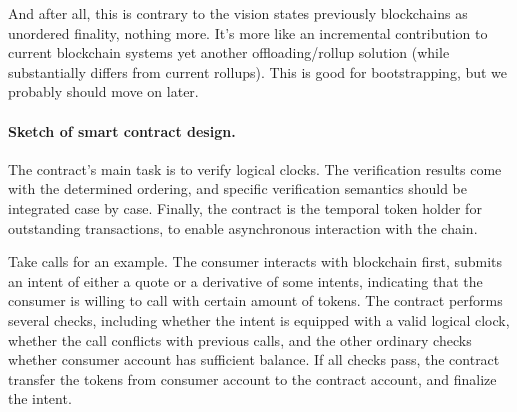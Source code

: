 And after all, this is contrary to the vision states previously \ie blockchains as unordered finality, nothing more.
It's more like an incremental contribution to current blockchain systems \ie yet another offloading/rollup solution (while substantially differs from current rollups).
This is good for bootstrapping, but we probably should move on later.

\paragraph{Sketch of smart contract design.}
The contract's main task is to verify logical clocks.
The verification results come with the determined ordering, and specific verification semantics should be integrated case by case.
Finally, the contract is the temporal token holder for outstanding transactions, to enable asynchronous interaction with the chain.

Take calls for an example.
The consumer interacts with blockchain first, submits an intent of either a quote or a derivative of some intents, indicating that the consumer is willing to call with certain amount of tokens.
The contract performs several checks, including whether the intent is equipped with a valid logical clock, whether the call conflicts with previous calls, and the other ordinary checks \eg whether consumer account has sufficient balance.
If all checks pass, the contract transfer the tokens from consumer account to the contract account, and finalize the intent.


